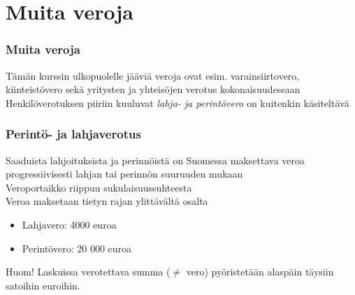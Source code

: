 \documentclass[]{beamer}\usepackage[]{graphicx}\usepackage[]{color}
\newcommand{\pblock}{\\ \vspace{0.5cm}\pause}
\newcommand{\socrativeOhje}{
\begin{itemize}
\item Surffaa osoitteeseen \url{m.socrative.com} (tai \url{socrative.com})
\item Siirry huoneeseen nimeltä \url{hruoho}
\end{itemize}
}
\newcommand{\taukoKysymys}{
\socrativeOhje
	\begin{block}{Kysymys}
	Mielestäni tähän väliin täydellinen tauko on
	\begin{enumerate}[(A)]
		\item 10 min
		\item 20 min
		\item 30 min
		\item Vähemmän 
		\item Enemmän
	\end{enumerate}	
	\end{block}
}
\begin{document}

\section{Muita veroja}

\begin{frame}
  \frametitle{Muita veroja}
  \pause
  Tämän kurssin ulkopuolelle jääviä veroja ovat esim. varainsiirtovero,  kiinteistövero sekä yritysten ja yhteisöjen verotus kokonaisuudessaan
  \pblock
  Henkilöverotuksen piiriin kuuluvat \emph{lahja- ja perintövero} on kuitenkin käsiteltävä  
\end{frame}

\begin{frame}
	\frametitle{Perintö- ja lahjaverotus}
	\pause
	Saaduista lahjoituksista ja perinnöistä on Suomessa maksettava veroa progressiivisesti lahjan tai perinnön suuruuden mukaan
	\pblock
	Veroportaikko riippuu sukulaisuussuhteesta
	\pblock
	Veroa maksetaan tietyn rajan ylittävältä osalta
	\begin{itemize}
		\item Lahjavero: 4000 euroa
		\item Perintövero: 20 000 euroa
	\pblock
	\end{itemize} 
	Huom! Laskuissa verotettava summa (\(\neq\) vero) pyöristetään alaspäin täysiin satoihin euroihin.
\end{frame}
\end{document}
